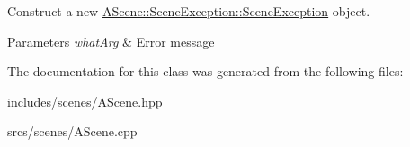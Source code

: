 Construct a new \hyperlink{class_a_scene_1_1_scene_exception_a43d2393247e90fabeeb049deac61119c}{A\+Scene\+::\+Scene\+Exception\+::\+Scene\+Exception} object. 


\begin{DoxyParams}{Parameters}
{\em what\+Arg} & Error message \\
\hline
\end{DoxyParams}


The documentation for this class was generated from the following files\+:\begin{DoxyCompactItemize}
\item 
includes/scenes/A\+Scene.\+hpp\item 
srcs/scenes/A\+Scene.\+cpp\end{DoxyCompactItemize}
